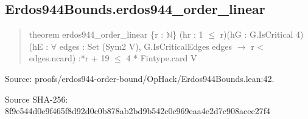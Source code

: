 \documentclass[11pt,a4paper]{article}
\begin{document}
\begin{samepage}
\subsection{Erdos944Bounds.erdos944\_order\_linear}
\begin{quote}\small\ttfamily theorem erdos944\_order\_linear \{r : \ensuremath{\mathbb{N}}\} (hr : 1 \ensuremath{\leq} r)\newline     (hG : G.IsCritical 4)\newline     (hE : \ensuremath{\forall} edges : Set (Sym2 V), G.IsCriticalEdges edges \ensuremath{\to} r < edges.ncard) :*r + 19 \ensuremath{\leq} 4 * Fintype.card V\end{quote}
{\small Source: proofs/erdos944-order-bound/OpHack/Erdos944Bounds.lean:42.\par}

{\small Source SHA-256: 8f9e544d0e9f465f8d92d0c0b878ab2bd9b542c0c969eaa4e2d7c908acec27f4\par}

\end{samepage}
\end{document}
